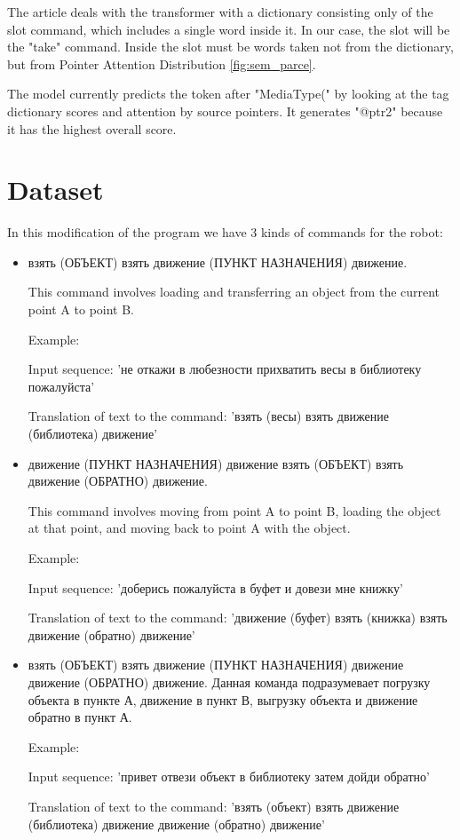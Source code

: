 \documentclass{article}
\begin{document}
The article \cite{article_4} deals with the transformer with a dictionary consisting only of the slot command, which includes a single word inside it. In our case, the slot will be the "take" command. Inside the slot must be words taken not from the dictionary, but from Pointer Attention Distribution \ref{fig:sem_parce}.

The model currently predicts the token after "MediaType(" by looking at the tag dictionary scores and attention by source pointers. It generates "@ptr2" because it has the highest overall score.

\section{Dataset}
In this modification of the program we have 3 kinds of commands for the robot:

\begin{itemize}
  \item взять (ОБЪЕКТ) взять движение (ПУНКТ НАЗНАЧЕНИЯ) движение.
  
  This command involves loading and transferring an object from the current point A to point B.
  
  Example: 
  
  Input sequence: 'не откажи в любезности прихватить весы в библиотеку пожалуйста'
  
  Translation of text to the command: 'взять (весы) взять движение (библиотека) движение'
  
  \item движение (ПУНКТ НАЗНАЧЕНИЯ) движение взять (ОБЪЕКТ) взять движение (ОБРАТНО) движение.
  
  This command involves moving from point A to point B, loading the object at that point, and moving back to point A with the object.
  
  Example: 
  
  Input sequence: 'доберись пожалуйста в буфет и довези мне книжку'
  
  Translation of text to the command: 'движение (буфет) взять (книжка) взять движение (обратно) движение'
  
  \item взять (ОБЪЕКТ) взять движение (ПУНКТ НАЗНАЧЕНИЯ) движение движение (ОБРАТНО) движение.
  Данная команда подразумевает погрузку объекта в пункте А, движение в пункт В, выгрузку объекта и движение обратно в пункт А.
  
  Example:
  
  Input sequence: 'привет отвези объект в библиотеку затем дойди обратно'
  
  Translation of text to the command: 'взять (объект) взять движение (библиотека) движение движение (обратно) движение'
\end{itemize}
\end{document}
